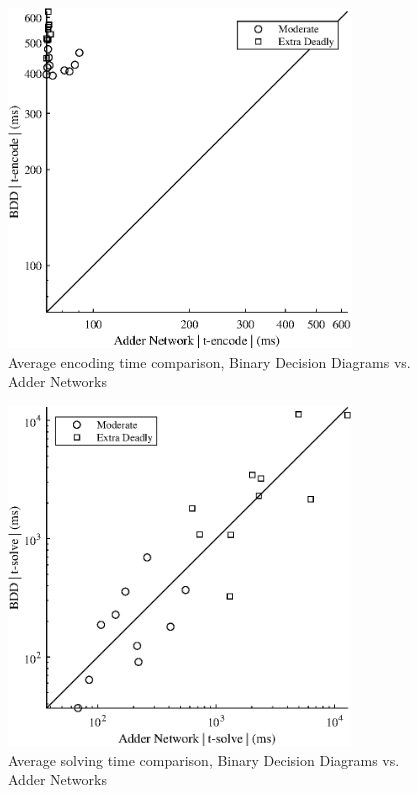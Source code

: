 {\begin{figure}
    \centering
    \includegraphics[height = 90mm]{Figures/killer_encode_compare.eps}
    \captionsetup{justification=centering,margin=0cm}
    \caption{Average encoding time comparison, Binary Decision Diagrams vs.\\Adder Networks}
    \label{killerCompareEncode}
\end{figure}

\begin{figure}
    \centering
    \includegraphics[height = 90mm]{Figures/killer_solve_compare.eps}
    \captionsetup{justification=centering,margin=0cm}
    \caption{Average solving time comparison, Binary Decision Diagrams vs.\\Adder Networks}
    \label{killerCompareSolve}
\end{figure}
}

